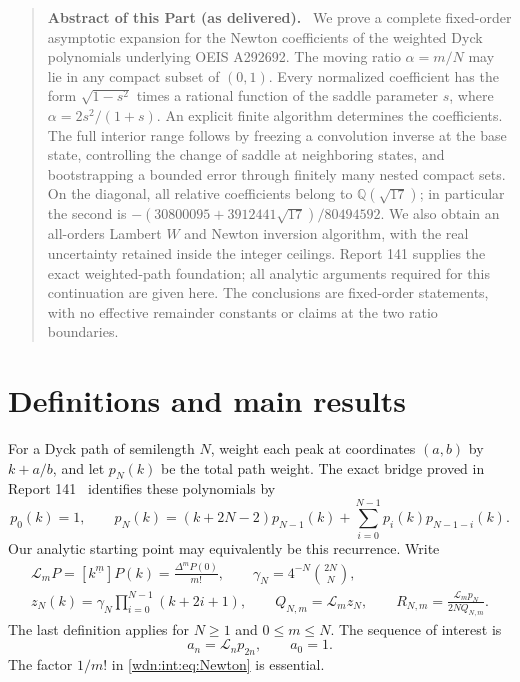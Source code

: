 \documentclass[11pt,letterpaper]{article}
\theoremstyle{remark}\newtheorem{remark}[theorem]{Remark}
\newcommand{\LL}{\mathcal L}
\newcommand{\fall}[2]{#1^{\underline{#2}}}
\newcommand{\Q}{\mathbb Q}
\newenvironment{partabstract}{\begin{quote}\small\noindent\textbf{Abstract of this Part (as delivered).}\ }{\end{quote}}
\begin{document}
\begin{partabstract}
We prove a complete fixed-order asymptotic expansion for the Newton
coefficients of the weighted Dyck polynomials underlying OEIS A292692.
The moving ratio $\alpha=m/N$ may lie in any compact subset of $(0,1)$.
Every normalized coefficient has the form $\sqrt{1-s^2}$ times a rational
function of the saddle parameter $s$, where $\alpha=2s^2/(1+s)$.
An explicit finite algorithm determines the coefficients. The full
interior range follows by freezing a convolution inverse at the base
state, controlling the change of saddle at neighboring states, and
bootstrapping a bounded error through finitely many nested compact sets.
On the diagonal, all relative coefficients belong to $\Q(\sqrt{17})$;
in particular the second is
$-(30800095+3912441\sqrt{17})/80494592$.
We also obtain an all-orders Lambert $W$ and Newton inversion algorithm,
with the real uncertainty retained inside the integer ceilings.
Report 141 supplies the exact weighted-path foundation; all analytic
arguments required for this continuation are given here. The conclusions
are fixed-order statements, with no effective remainder constants or
claims at the two ratio boundaries.
\end{partabstract}
\section{Definitions and main results}
For a Dyck path of semilength $N$, weight each peak at coordinates $(a,b)$
by $k+a/b$, and let $p_N(k)$ be the total path weight. The exact bridge
proved in Report 141~\cite{foundation} identifies these polynomials by
\begin{equation}\label{wdn:int:eq:recurrence}
 p_0(k)=1,\qquad
 p_N(k)=(k+2N-2)p_{N-1}(k)
       +\sum_{i=0}^{N-1}p_i(k)p_{N-1-i}(k).
\end{equation}
Our analytic starting point may equivalently be this recurrence. Write
\begin{gather}
 \LL_m P=[\fall{k}{m}]P(k)=\frac{\Delta^mP(0)}{m!},\qquad
 \gamma_N=4^{-N}\binom{2N}{N},\label{wdn:int:eq:Newton}\\
 z_N(k)=\gamma_N\prod_{i=0}^{N-1}(k+2i+1),\qquad
 Q_{N,m}=\LL_mz_N,\qquad
 R_{N,m}=\frac{\LL_mp_N}{2NQ_{N,m}}.\label{wdn:int:eq:normalization}
\end{gather}
The last definition applies for $N\ge1$ and $0\le m\le N$.
The sequence of interest is
\begin{equation}\label{wdn:int:eq:diagonaldef}
 a_n=\LL_np_{2n},\qquad a_0=1.
\end{equation}
The factor $1/m!$ in \eqref{wdn:int:eq:Newton} is essential.
\end{document}
